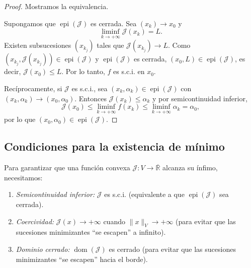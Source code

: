 \documentclass[12pt]{book}
\newcommand{\dom}{\operatorname{dom}}
\theoremstyle{definition}
\theoremstyle{plain}
\theoremstyle{remark}
\begin{document}
\begin{proof} 
Mostramos la equivalencia. 

 
 \medskip
 
 \noindent
 [1/2]
 Supongamos que $\operatorname{epi}(\mathcal{J})$ es cerrada. Sea $(x_k) \to x_0$ y 
 \[
 \liminf_{k \to +\infty} \mathcal{J}(x_k) = L.
 \]
 Existen subsucesiones $(x_{k_j})$ tales que $\mathcal{J}(x_{k_j}) \to L$. Como $(x_{k_j}, \mathcal{J}(x_{k_j})) \in \operatorname{epi}(\mathcal{J})$ y $\operatorname{epi}(\mathcal{J})$ es cerrada, $(x_0, L) \in \operatorname{epi}(\mathcal{J})$, es decir, $\mathcal{J}(x_0) \leq L$. Por lo tanto, $f$ es s.c.i. en $x_0$.

\medskip

\noindent 
[2/2]
        Recíprocamente, si $\mathcal{J}$ es s.c.i., sea $(x_k, \alpha_k) \in \operatorname{epi}(\mathcal{J})$ con $(x_k, \alpha_k) \to (x_0, \alpha_0)$. Entonces $\mathcal{J}(x_k) \leq \alpha_k$ y por semicontinuidad inferior,
        \[
        \mathcal{J}(x_0) \leq \liminf_{k \to +\infty} f(x_k) \leq \liminf_{k \to +\infty} \alpha_k = \alpha_0,
        \]
        por lo que $(x_0, \alpha_0) \in \operatorname{epi}(\mathcal{J})$.
\end{proof}

\subsection{Condiciones para la existencia de mínimo}

Para garantizar que una función convexa $\mathcal{J}: V \to \overline{\mathbb{R}}$ {alcanza su ínfimo}, necesitamos:
\begin{enumerate}
    \item \emph{Semicontinuidad inferior:} $\mathcal{J}$ es s.c.i. (equivalente a que $\operatorname{epi}(\mathcal{J})$ sea cerrada).
    \item \emph{Coercividad:} $\mathcal{J}(x) \to +\infty$ cuando $\|x\|_V \to +\infty$ (para evitar que las sucesiones minimizantes ``se escapen'' a infinito).
    \item \emph{Dominio cerrado:} $\dom(\mathcal{J})$ es cerrado (para evitar que las sucesiones minimizantes ``se escapen'' hacia el borde).
\end{enumerate}
\end{document}

